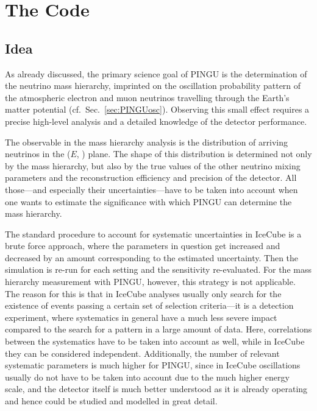 \section{The \papa Code}
\label{sec:papa}

\subsection{Idea}
\label{sec:sim_idea}

As already discussed, the primary science goal of PINGU is the determination of 
the neutrino mass hierarchy, imprinted on the oscillation probability pattern 
of the atmospheric electron and muon neutrinos travelling through the Earth's 
matter potential (cf.~Sec.~\ref{sec:PINGUosc}). Observing this small effect 
requires a precise high-level analysis and a detailed knowledge of the detector 
performance. 

The observable in the mass hierarchy analysis is the distribution of arriving 
neutrinos in the ($E$, \coszen) plane. The shape of this distribution is 
determined not only by the mass hierarchy, but also by the true values of the 
other neutrino mixing parameters and the reconstruction efficiency and 
precision of the detector. All those---and especially their 
uncertainties---have to be taken into account when one wants to estimate the 
significance with which PINGU can determine the mass hierarchy.

The standard procedure to account for systematic uncertainties in IceCube is a 
brute force approach, where the parameters in question get increased and 
decreased by an amount corresponding to the estimated uncertainty. Then the 
simulation is re-run for each setting and the sensitivity re-evaluated. For the 
mass hierarchy measurement with PINGU, however, this strategy is not 
applicable. The reason for this is that in IceCube analyses usually only search 
for the existence of events passing a certain set of selection criteria---it is 
a detection experiment, where systematics in general have a much less severe 
impact compared to the search for a pattern in a large amount of data. Here, 
correlations between the systematics have to be taken into account as well, 
while in IceCube they can be considered independent. Additionally, the number 
of relevant systematic parameters is much higher for PINGU, since in IceCube 
oscillations usually do not have to be taken into account due to the much 
higher energy scale, and the detector itself is much better understood as it is 
already operating and hence could be studied and modelled in great detail.

